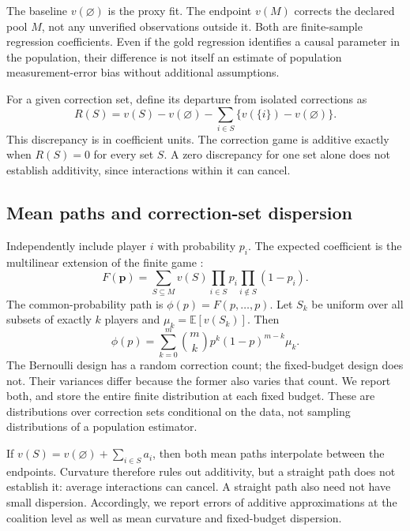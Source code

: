 \documentclass[11pt]{article}
\newcommand{\E}{\mathbb{E}}
\begin{document}
The baseline $v(\varnothing)$ is the proxy fit. The endpoint $v(M)$ corrects the
declared pool $M$, not any unverified observations outside it. Both are
finite-sample regression coefficients. Even if the gold regression identifies a
causal parameter in the population, their difference is not itself an estimate
of population measurement-error bias without additional assumptions.

For a given correction set, define its departure from isolated corrections as
\begin{equation}
 R(S)=v(S)-v(\varnothing)
       -\sum_{i\in S}\{v(\{i\})-v(\varnothing)\}.
 \label{eq:nonadditivity}
\end{equation}
This discrepancy is in coefficient units. The correction game is additive
exactly when $R(S)=0$ for every set $S$. A zero discrepancy for one set alone
does not establish additivity, since interactions within it can cancel.

\subsection{Mean paths and correction-set dispersion}

Independently include player $i$ with probability $p_i$. The expected coefficient
is the multilinear extension of the finite game \citep{owen1972}:
\begin{equation}
 F(\mathbf p)=\sum_{S\subseteq M}v(S)
       \prod_{i\in S}p_i\prod_{i\notin S}(1-p_i).
\end{equation}
The common-probability path is $\phi(p)=F(p,\ldots,p)$. Let $S_k$ be uniform over
all subsets of exactly $k$ players and $\mu_k=\E[v(S_k)]$. Then
\begin{equation}
 \phi(p)=\sum_{k=0}^{m}\binom{m}{k}p^k(1-p)^{m-k}\mu_k.
 \label{eq:mixture}
\end{equation}
The Bernoulli design has a random correction count; the fixed-budget design does
not. Their variances differ because the former also varies that count. We
report both, and store the entire finite distribution at each fixed budget.
These are distributions over correction sets conditional on the data, not
sampling distributions of a population estimator.

If $v(S)=v(\varnothing)+\sum_{i\in S}a_i$, then both mean paths interpolate
between the endpoints. Curvature therefore rules out additivity, but a straight
path does not establish it: average interactions can cancel. A straight path
also need not have small dispersion. Accordingly, we report errors of additive
approximations at the coalition level as well as mean curvature and fixed-budget
dispersion.
\end{document}
